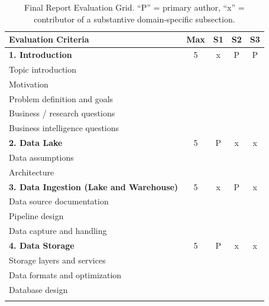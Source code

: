 \documentclass[11pt,a4paper]{article}
\begin{document}
\begin{table}[H]
  \centering
  \caption[Final Report Evaluation Grid]{Final Report Evaluation Grid. ``P'' = primary author,
    ``x'' = contributor of a substantive domain-specific subsection.}
  \label{tab:evaluation_grid}
  \small
  \begin{tabular}{@{}p{8.5cm} c c c c@{}}
    \toprule
    \textbf{Evaluation Criteria} & \textbf{Max} & \textbf{S1} & \textbf{S2} & \textbf{S3} \\
    \midrule
    \textbf{1. Introduction}                                & 5 & x & P & P \\
    \quad Topic introduction                                &   &   &   &   \\
    \quad Motivation                                        &   &   &   &   \\
    \quad Problem definition and goals                      &   &   &   &   \\
    \quad Business / research questions                     &   &   &   &   \\
    \quad Business intelligence questions                   &   &   &   &   \\
    \addlinespace
    \textbf{2. Data Lake}                                   & 5 & P & x & x \\
    \quad Data assumptions                                  &   &   &   &   \\
    \quad Architecture                                      &   &   &   &   \\
    \addlinespace
    \textbf{3. Data Ingestion (Lake and Warehouse)}         & 5 & x & P & x \\
    \quad Data source documentation                         &   &   &   &   \\
    \quad Pipeline design                                   &   &   &   &   \\
    \quad Data capture and handling                         &   &   &   &   \\
    \addlinespace
    \textbf{4. Data Storage}                                & 5 & P & x & x \\
    \quad Storage layers and services                       &   &   &   &   \\
    \quad Data formats and optimization                     &   &   &   &   \\
    \quad Database design                                   &   &   &   &   \\
    \addlinespace

\end{tabular}
\end{table}
\end{document}
